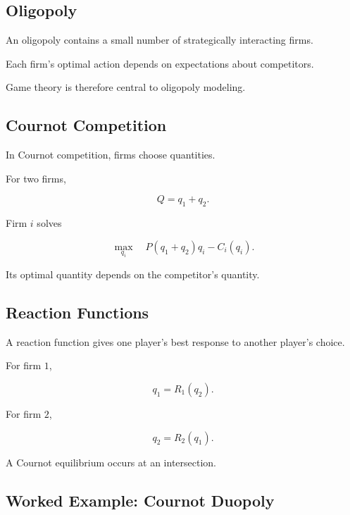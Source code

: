 \subsection{Oligopoly}
\label{subsec:oligopoly}

An oligopoly contains a small number of strategically interacting firms.

Each firm's optimal action depends on expectations about competitors.

Game theory is therefore central to oligopoly modeling.

\subsection{Cournot Competition}
\label{subsec:cournot-competition}

In Cournot competition, firms choose quantities.

For two firms,

\[
\boxed{
Q=q_1+q_2.
}
\]

Firm \(i\) solves

\[
\boxed{
\max_{q_i}
\quad
P(q_1+q_2)q_i-C_i(q_i).
}
\]

Its optimal quantity depends on the competitor's quantity.

\subsection{Reaction Functions}
\label{subsec:reaction-functions}

A reaction function gives one player's best response to another player's
choice.

For firm \(1\),

\[
\boxed{
q_1
=
R_1(q_2).
}
\]

For firm \(2\),

\[
\boxed{
q_2
=
R_2(q_1).
}
\]

A Cournot equilibrium occurs at an intersection.

\subsection{Worked Example: Cournot Duopoly}
\label{subsec:worked-cournot}

